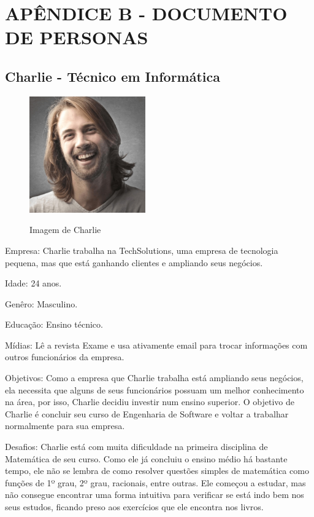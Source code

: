 \chapter*{APÊNDICE B - DOCUMENTO DE PERSONAS}\label{apendice_personas}

\section{Charlie - Técnico em Informática}

\begin{figure}[H]
\centering
\caption{Imagem de Charlie}
\includegraphics[width=5cm]{figuras/personas/figura_persona_1}
\label{figura_persona_1}
\end{figure}


Empresa: Charlie trabalha na TechSolutions, uma empresa de tecnologia pequena, mas que está ganhando
clientes e ampliando seus negócios.

Idade: 24 anos.

Genêro: Masculino.

Educação: Ensino técnico.

Mídias: Lê a revista Exame e usa ativamente email para trocar informações com 
outros funcionários da empresa.

Objetivos: Como a empresa que Charlie trabalha está ampliando seus negócios, ela
necessita que alguns de seus funcionários possuam um melhor conhecimento na 
área, por isso, Charlie decidiu investir num ensino superior. O objetivo de Charlie é 
concluir seu curso de Engenharia de Software e voltar a trabalhar normalmente 
para sua empresa.

Desafios: Charlie está com muita dificuldade na primeira disciplina de Matemática de seu curso. Como ele já concluiu o ensino médio há bastante tempo, ele não se lembra de como resolver 
questões simples de matemática como funções de 1º grau, 2º grau, racionais, entre outras. Ele começou a estudar, mas 
não consegue encontrar uma forma intuitiva para verificar se está indo bem nos 
seus estudos, ficando preso aos exercícios que ele encontra nos livros.

